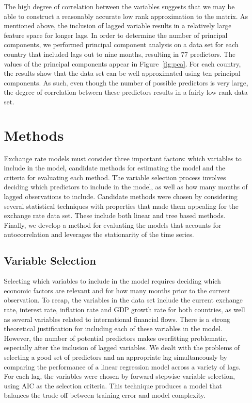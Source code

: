 \documentclass{sig-alternate-05-2015}
\begin{document}
The high degree of correlation between the variables suggests that we may be able to construct a reasonably accurate low rank approximation to the matrix. As mentioned above, the inclusion of lagged variable results in a relatively large feature space for longer lags. In order to determine the number of principal components, we performed principal component analysis on a data set for each country that included lags out to nine months, resulting in 77 predictors. The values of the principal components appear in Figure~\ref{fig:pca}. For each country, the results show that the data set can be well approximated using ten principal components. As such, even though the number of possible predictors is very large, the degree of correlation between these predictors results in a fairly low rank data set.

\section{Methods}
Exchange rate models must consider three important factors: which variables to include in the model, candidate methods for estimating the model and the criteria for evaluating each method. The variable selection process involves deciding which predictors to include in the model, as well as how many months of lagged observations to include. Candidate methods were chosen by considering several statistical techniques with properties that made them appealing for the exchange rate data set. These include both linear and tree based methods. Finally, we develop a method for evaluating the models that accounts for autocorrelation and leverages the stationarity of the time series.

\subsection{Variable Selection}
Selecting which variables to include in the model requires deciding which economic factors are relevant and for how many months prior to the current observation. To recap, the variables in the data set include the current exchange rate, interest rate, inflation rate and GDP growth rate for both countries, as well as several variables related to international financial flows. There is a strong theoretical justification for including each of these variables in the model. However, the number of potential predictors makes overfitting problematic, especially after the inclusion of lagged variables. We dealt with the problems of selecting a good set of predictors and an appropriate lag simultaneously by comparing the performance of a linear regression model across a variety of lags. For each lag, the variables were chosen by forward stepwise variable selection, using AIC as the selection criteria. This technique produces a model that balances the trade off between training error and model complexity.
\end{document}
